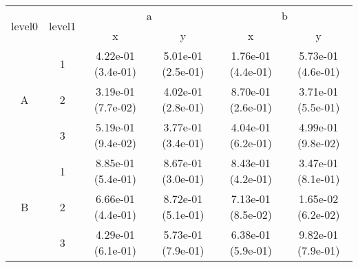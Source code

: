 \begin{tabular}{cccccc}
\toprule
\multirow{2}{*}{level0} & \multirow{2}{*}{level1}&\multicolumn{2}{c}{a}&\multicolumn{2}{c}{b}\tabularnewline
\cmidrule(lr){3-4}
\cmidrule(lr){5-6}
&&x&y&x&y\tabularnewline
\midrule
\multirow{3}{*}{A}&1& 4.22e-01 (3.4e-01)& 5.01e-01 (2.5e-01)& 1.76e-01 (4.4e-01)& 5.73e-01 (4.6e-01)\tabularnewline
&2& 3.19e-01 (7.7e-02)& 4.02e-01 (2.8e-01)& 8.70e-01 (2.6e-01)& 3.71e-01 (5.5e-01)\tabularnewline
&3& 5.19e-01 (9.4e-02)& 3.77e-01 (3.4e-01)& 4.04e-01 (6.2e-01)& 4.99e-01 (9.8e-02)\tabularnewline
\midrule
\multirow{3}{*}{B}&1& 8.85e-01 (5.4e-01)& 8.67e-01 (3.0e-01)& 8.43e-01 (4.2e-01)& 3.47e-01 (8.1e-01)\tabularnewline
&2& 6.66e-01 (4.4e-01)& 8.72e-01 (5.1e-01)& 7.13e-01 (8.5e-02)& 1.65e-02 (6.2e-02)\tabularnewline
&3& 4.29e-01 (6.1e-01)& 5.73e-01 (7.9e-01)& 6.38e-01 (5.9e-01)& 9.82e-01 (7.9e-01)\tabularnewline
\bottomrule
\end{tabular}
